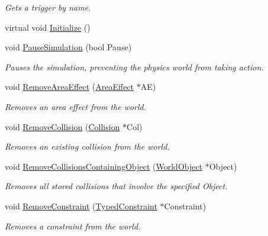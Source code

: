 \begin{DoxyCompactItemize}
\begin{DoxyCompactList}\small\item\em Gets a trigger by name. \item\end{DoxyCompactList}\item 
virtual void \hyperlink{classMezzanine_1_1PhysicsManager_ab09c912dc48b7082bd07a536167bc3d3}{Initialize} ()
\item 
void \hyperlink{classMezzanine_1_1PhysicsManager_a83b7f0be56d405ecbc51fe770e1f93b6}{PauseSimulation} (bool Pause)
\begin{DoxyCompactList}\small\item\em Pauses the simulation, preventing the physics world from taking action. \item\end{DoxyCompactList}\item 
void \hyperlink{classMezzanine_1_1PhysicsManager_afb424692ede644ccef8327aae1ea9674}{RemoveAreaEffect} (\hyperlink{classMezzanine_1_1AreaEffect}{AreaEffect} $\ast$AE)
\begin{DoxyCompactList}\small\item\em Removes an area effect from the world. \item\end{DoxyCompactList}\item 
void \hyperlink{classMezzanine_1_1PhysicsManager_a7f36766f759962902d4af3b78b94e53e}{RemoveCollision} (\hyperlink{classMezzanine_1_1Collision}{Collision} $\ast$Col)
\begin{DoxyCompactList}\small\item\em Removes an existing collision from the world. \item\end{DoxyCompactList}\item 
void \hyperlink{classMezzanine_1_1PhysicsManager_ade3423f416ddeeafcde5e89d6edcd221}{RemoveCollisionsContainingObject} (\hyperlink{classMezzanine_1_1WorldObject}{WorldObject} $\ast$Object)
\begin{DoxyCompactList}\small\item\em Removes all stored collisions that involve the specified Object. \item\end{DoxyCompactList}\item 
void \hyperlink{classMezzanine_1_1PhysicsManager_a78713bb51e2d3247964647bc35f166f8}{RemoveConstraint} (\hyperlink{classMezzanine_1_1TypedConstraint}{TypedConstraint} $\ast$Constraint)
\begin{DoxyCompactList}\small\item\em Removes a constraint from the world. \item\end{DoxyCompactList}\item 

\end{DoxyCompactItemize}
